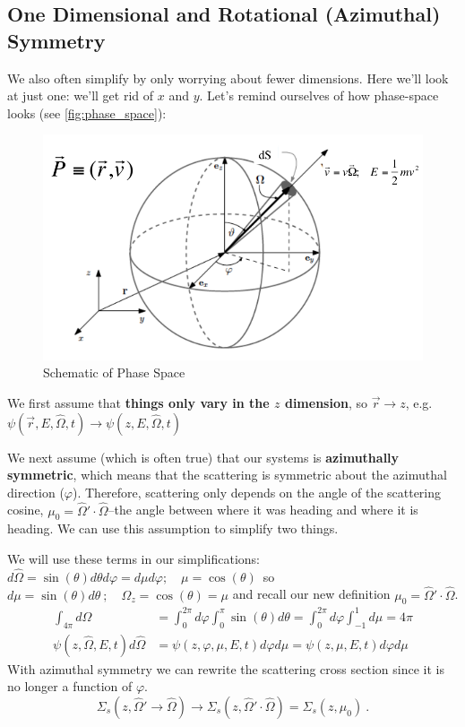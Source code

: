\documentclass[12pt]{article}
\newcommand{\vOmega}{\ensuremath{\hat{\Omega}}}
\begin{document}
\subsection*{One Dimensional and Rotational (Azimuthal) Symmetry}
We also often simplify by only worrying about fewer dimensions. Here we'll look at just one: we'll get rid of $x$ and $y$. Let's remind ourselves of how phase-space looks (see \autoref{fig:phase_space}):
\begin{figure}[h!]
    \begin{center}
    \includegraphics[keepaspectratio, width = 4 in]{phase-space}
    \end{center}
    \caption{Schematic of Phase Space}
    \label{fig:phase_space}
\end{figure}

We first assume that \textbf{things only vary in the $z$ dimension}, so $\vec{r} \rightarrow z$, e.g.\\ $\psi(\vec{r}, E, \vOmega, t) \rightarrow \psi(z, E, \vOmega, t)$

We next assume (which is often true) that our systems is \textbf{azimuthally symmetric}, which means that the scattering is symmetric about the azimuthal direction ($\varphi$). Therefore, scattering only depends on the angle of the scattering cosine, $\mu_0 =\vOmega' \cdot \vOmega$--the angle between where it was heading and where it is heading. We can use this assumption to simplify two things. 

We will use these terms in our simplifications:\\
$d\vOmega = \sin(\theta) d\theta d\varphi = d\mu d\varphi; \quad \mu = \cos(\theta)\,$ so $d\mu = \sin(\theta)d\theta\:; \quad \Omega_z = \cos(\theta) = \mu$ and recall our new definition $\mu_0 = \vOmega' \cdot \vOmega$.
\begin{align*}
\int_{4 \pi} d\vOmega &= \int_0^{2\pi} d\varphi \int_{0}^{\pi} \sin(\theta) d\theta =  \int_0^{2\pi} d\varphi \int_{-1}^1 d\mu = 4\pi \\
\psi(z,\vOmega,E,t) d\vOmega &= \psi(z,\varphi, \mu,E,t) d\varphi  d\mu =  \psi(z, \mu,E,t) d\varphi  d\mu 
\end{align*}
%
With azimuthal symmetry we can rewrite the scattering cross section since it is no longer a function of $\varphi$.
\[\Sigma_s(z, \vOmega' \rightarrow \vOmega) \rightarrow \Sigma_s(z, \vOmega' \cdot \vOmega) = \Sigma_s(z, \mu_0) \:.\]
\end{document}
